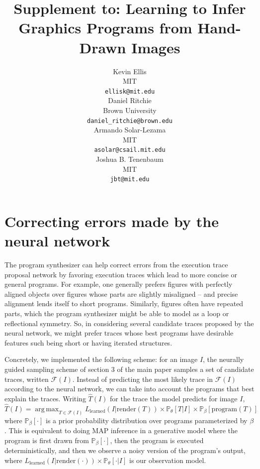 \documentclass{article}
\title{Supplement to: Learning to Infer Graphics Programs from Hand-Drawn Images}
\author{
Kevin Ellis\\
  MIT\\
  \texttt{ellisk@mit.edu} \\
  \And
  Daniel Ritchie\\
Brown University\\
 \texttt{daniel\_ritchie@brown.edu} \\
 \And
 Armando Solar-Lezama\\
 MIT\\
\texttt{asolar@csail.mit.edu} \\
\And
Joshua B. Tenenbaum \\
MIT\\
\texttt{jbt@mit.edu}
}
\DeclareMathOperator*{\argmax}{arg\,max} %
\newcommand{\probability}{\mathds{P}} %
\begin{document}

\maketitle

\section{Correcting errors made by the neural network}\label{synthesizerHelpsParsing}
The program synthesizer can help correct errors from the execution trace proposal network by favoring execution traces which lead to more concise or general programs.
For example, one generally prefers figures with perfectly aligned objects over figures whose parts are slightly misaligned -- and precise alignment lends itself to short programs.
Similarly, figures often have repeated parts,
which the program synthesizer might be able to model as a loop or reflectional symmetry.
So, in considering several candidate traces proposed by the neural network,
we might prefer traces whose best programs have desirable features such being short or having iterated structures.

Concretely, we implemented the following scheme: for an image $I$, the neurally guided sampling scheme of section 3 of the main paper samples a set of candidate traces, written $\mathcal{F}(I)$.
Instead of predicting the most likely trace in $\mathcal{F}(I)$ according to the neural network,
we can take into account the programs that best explain the traces. 
Writing $\hat{T}(I)$ for the trace the model predicts for image $I$,
\begin{equation}
\hat{T}(I) = \argmax_{T\in \mathcal{F}(I)} L_{\text{learned}}(I | \text{render}(T))\times \probability_\theta[T|I] \times\probability_{\beta} [ \text{program}(T)] 
\end{equation}
where $\probability_{\beta} [\cdot]$ is a prior probability
distribution over programs parameterized by $\beta$.
This is equivalent to doing
MAP inference in a generative model where the program is first drawn
from $\probability_{\beta} [\cdot]$, then the program is executed deterministically,
and then we observe a noisy version of the program's output, where $L_\text{learned}(I|\text{render}(\cdot))\times\probability_\theta[\cdot|I]$
is our observation model.
\end{document}
